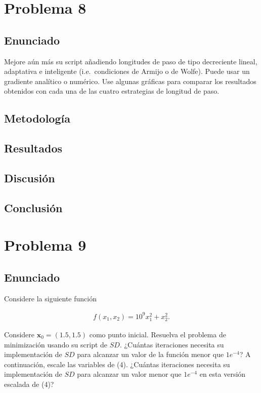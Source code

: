 \documentclass{article}
\begin{document}
\section{Problema 8}

\subsection{Enunciado}
Mejore aún más su script añadiendo longitudes de paso de tipo decreciente lineal, adaptativa e inteligente (i.e.\ condiciones de Armijo o de Wolfe). Puede usar un gradiente analítico o numérico. Use algunas gráficas para comparar los resultados obtenidos con cada una de las cuatro estrategias de longitud de paso.

\subsection{Metodología}

\subsection{Resultados}
\setcounter{equation}{0}

\subsection{Discusión}

\subsection{Conclusión}

\section{Problema 9}

\subsection{Enunciado}
Considere la siguiente función

\begin{align}
    f(x_1, x_2) = 10^{9}x_1^{2} + x_2^{2}. \tag{4}
\end{align}

Considere $\mathbf{x}_0 = (1.5, 1.5)$ como punto inicial. Resuelva el problema de minimización usando su script de $SD$. ¿Cuántas iteraciones necesita su implementación de $SD$ para alcanzar un valor de la función menor que $1e^{-4}$? A continuación, escale las variables de (4). ¿Cuántas iteraciones necesita su implementación de $SD$ para alcanzar un valor menor que $1e^{-4}$ en esta versión escalada de (4)?
\end{document}
